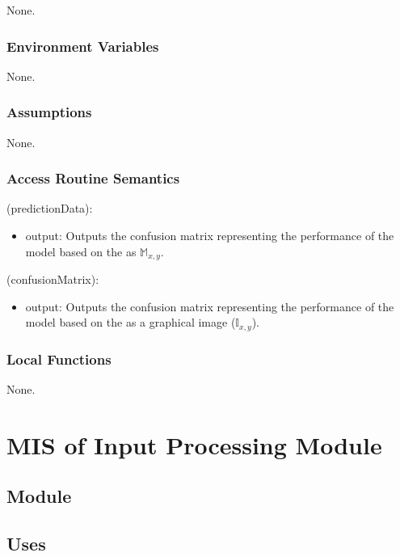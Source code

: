 \documentclass[12pt, titlepage]{article}
\begin{document}
None.

\subsubsection{Environment Variables}

None.

\subsubsection{Assumptions}

None.

\subsubsection{Access Routine Semantics}

\noindent {}(predictionData):
\begin{itemize} 
\item output: Outputs the confusion matrix representing the performance of the model based on the
 as $\mathbb{M}_{x, y}$.
\end{itemize}

\noindent {}(confusionMatrix):
\begin{itemize} 
\item output: Outputs the confusion matrix representing the performance of the model based on the
 as a graphical image ($\mathbb{I}_{x, y}$).
\end{itemize}

\subsubsection{Local Functions}

None.

\section{MIS of Input Processing Module} \label{ModuleIP} 

\subsection{Module}


\subsection{Uses}
\end{document}
